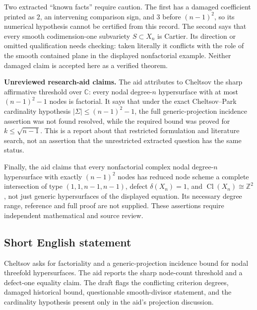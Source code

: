 \documentclass[11pt]{article}
\newcommand{\Z}{\mathbb{Z}}
\newcommand{\C}{\mathbb{C}}
\begin{document}
Two extracted ``known facts'' require caution. The first has a damaged coefficient printed as $2$, an intervening comparison sign, and $3$ before $(n-1)^2$, so its numerical hypothesis cannot be certified from this record. The second says that every smooth codimension-one subvariety $S\subset X_n$ is Cartier. Its direction or omitted qualification needs checking: taken literally it conflicts with the role of the smooth contained plane in the displayed nonfactorial example. Neither damaged claim is accepted here as a verified theorem.

\textbf{Unreviewed research-aid claims.} The aid attributes to Cheltsov the sharp affirmative threshold over $\C$: every nodal degree-$n$ hypersurface with at most $(n-1)^2-1$ nodes is factorial. It says that under the exact Cheltsov--Park cardinality hypothesis $|\Sigma|\le(n-1)^2-1$, the full generic-projection incidence assertion was not found resolved, while the required bound was proved for $k\le\sqrt{n-1}$. This is a report about that restricted formulation and literature search, not an assertion that the unrestricted extracted question has the same status.

Finally, the aid claims that every nonfactorial complex nodal degree-$n$ hypersurface with exactly $(n-1)^2$ nodes has reduced node scheme a complete intersection of type $(1,1,n-1,n-1)$, defect $\delta(X_n)=1$, and $\operatorname{Cl}(X_n)\cong\Z^2$, not just generic hypersurfaces of the displayed equation. Its necessary degree range, reference and full proof are not supplied. These assertions require independent mathematical and source review.
\subsection{Short English statement}
Cheltsov asks for factoriality and a generic-projection incidence bound for nodal threefold hypersurfaces. The aid reports the sharp node-count threshold and a defect-one equality claim. The draft flags the conflicting criterion degrees, damaged historical bound, questionable smooth-divisor statement, and the cardinality hypothesis present only in the aid's projection discussion.
\end{document}
